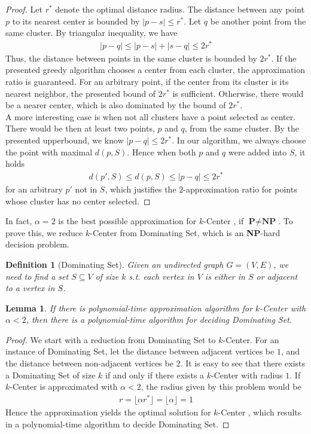 \documentclass[11pt,psfig,times]{article}
\newcommand*{\PTIME}{\textbf{P}}
\newcommand*{\NP}{\textbf{NP}}
\newtheorem{lemma}[theorem]{Lemma}
\newtheorem{definition}[theorem]{Definition}
\begin{document}
\begin{proof}
    Let $r^*$ denote the optimal distance radius. 
    The distance between any point $p$ to its nearest center is bounded by $|p - s| \leq r^*$. 
    Let $q$ be another point from the same cluster. By triangular inequality, we have 
    \begin{align*}
        |p - q| \leq |p - s| + |s - q| \leq 2r^*    
    \end{align*}
    Thus, the distance between points in the same cluster is bounded by $2r^*$. If the presented greedy algorithm
    chooses a center from each cluster, the approximation ratio is guaranteed. For an arbitrary point, if the center from 
    its cluster is its nearest neighbor, the presented bound of $2r^*$ is sufficient. 
    Otherwise, there would be a nearer center, which is also dominated by the bound of $2r^*$.  \\
    A more interesting case is when not all clusters have a point selected as center. 
    There would be then at least two points, $p$ and $q$,  from the same cluster. By the presented upperbound, 
    we know $|p - q| \leq 2r^*$. In our algorithm, we always choose the point with maximal $d(p, S)$. Hence 
    when both $p$ and $q$ were added into $S$, it holds
    \begin{align*}
        d(p', S) \leq d(p, S) \leq |p - q| \leq 2r^*
    \end{align*} 
    for an arbitrary $p'$ not in $S$, which justifies the $2$-approximation ratio for points whose cluster has no center selected.
\end{proof}
In fact, $\alpha = 2$ is the best possible approximation for $k$-Center , if $\PTIME \neq \NP$. To prove this, 
we reduce $k$-Center from Dominating Set, which is an \NP-hard decision problem.
\begin{definition}[Dominating Set]
    Given an undirected graph $G = (V, E)$, we need to find a set $S \subseteq V$ of size $k$ s.t. each vertex in $V$ is either in $S$ or adjacent to a vertex in $S$.
\end{definition}
\begin{lemma}
    If there is polynomial-time approximation algorithm for $k$-Center  with $\alpha < 2$, 
    then there is a polynomial-time algorithm for deciding Dominating Set.
\end{lemma}
\begin{proof}
    We start with a reduction from Dominating Set to $k$-Center. For an instance of Dominating Set, 
    let the distance between adjacent vertices be $1$, and the distance between non-adjacent vertices be $2$. It is easy to see 
    that there exists a Dominating Set of size $k$ if and only if there exists a $k$-Center with radius $1$. 
    If $k$-Center is approximated with $\alpha < 2$, the radius given by this problem would be 
    \begin{align*}
    r = \lfloor \alpha r^* \rfloor = \lfloor \alpha \rfloor = 1
    \end{align*}
    Hence the approximation yields the optimal solution for $k$-Center , which results 
    in a polynomial-time algorithm to decide Dominating Set.
\end{proof}
\end{document}
